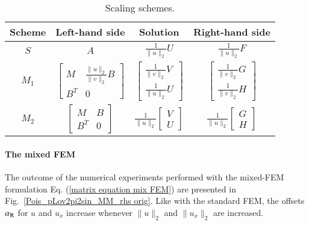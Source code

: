 \documentclass[review,3p]{elsarticle}
\begin{document}

%  

\begin{table}[!ht]
\centering
\caption [sss] {Scaling schemes.}
\label{scaling schemes std and mix FEM} 
\begin{tabular}{c c c c}
\hline  
{Scheme}& Left-hand side & Solution & Right-hand side \\	\hline
$S$ & {$A$} & $\frac{1}{\|u\|_{2}} U$ & $\frac{1}{\|u\|_{2}} F$ \\	\hline
$M_1$ & {$\left[ \begin{array}{cc} M & \frac{\|u\|_{2}}{\|v\|_{2}} B  \\ B^T & 0 \end{array}\right]$ } & $\left[ \begin{array}{cc} \frac{1}{\|v\|_{2}} {V} \\ \frac{1}{\|u\|_{2}} {U} \end{array}\right]$ & $\left[ \begin{array}{cc} \frac{1}{\|v\|_{2}} G \\ {\frac{1}{\|v\|_{2}} H} \end{array}\right]$\\	\hline
$M_2$ & {$\left[ \begin{array}{cc} M & B  \\ B^T & 0 \end{array}\right]$ } & $\frac{1}{\|u\|_{2}} \left[ \begin{array}{cc} {V} \\ {U} \end{array}\right]$ & $\frac{1}{\|u\|_{2}} \left[ \begin{array}{cc}  G \\ H \end{array}\right]$ \\	\hline
\end{tabular}
\end{table}


\paragraph{The mixed FEM}			\label{scaling_mix_FEM}

The outcome of the numerical experiments performed with the mixed-FEM formulation Eq. (\ref{matrix equation mix FEM}) are presented in Fig.~\ref{Pois_pLov2pi2sin_MM_rhs orig}.
Like with the standard FEM, the offsets $\alpha_{\rm R}$ for $u$ and $u_x$ increase whenever $\|u\|_2$ and $\|u_x\|_2$ are increased.
\end{document}
